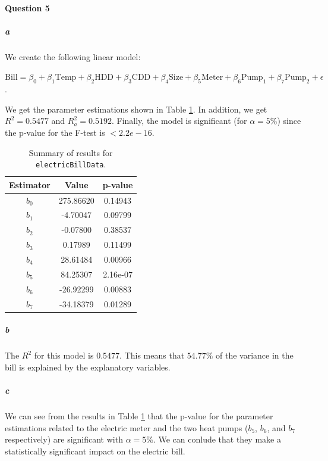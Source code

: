 \documentclass[]{article}
\let\oldparagraph\paragraph
\renewcommand{\paragraph}[1]{\oldparagraph{#1}\mbox{}}
\let\oldsubparagraph\subparagraph
\renewcommand{\subparagraph}[1]{\oldsubparagraph{#1}\mbox{}}
\begin{document}
\paragraph{\Large Question 5}\normalsize
\subparagraph{\Large a}\normalsize

We create the following linear model:

$\text{Bill} = \beta_0 + \beta_1 \text{Temp} + \beta_2 \text{HDD}+ \beta_3 \text{CDD}+ \beta_4 \text{Size} + \beta_5 \text{Meter} + \beta_6 \text{Pump}_1 + \beta_7 \text{Pump}_2 + \epsilon$.

We get the parameter estimations shown in Table \ref{q5a}. In addition, we get $R^2 = 0.5477$ and $R^2_a = 0.5192$. Finally, the model is significant (for $\alpha = 5\%$) since the p-value for the F-test is $< 2.2e-16$.

\begin{table}[!ht]
\caption{Summary of results for \texttt{electricBillData}.}
\begin{center}
\begin{tabular}{|c|c|c|}
\hline
Estimator & Value & p-value \\
\hline
$b_0$ & 275.86620 & 0.14943 \\
$b_1$ & -4.70047 & 0.09799 \\
$b_2$ & -0.07800 & 0.38537 \\
$b_3$ & 0.17989 & 0.11499 \\
$b_4$ & 28.61484 & 0.00966 \\
$b_5$ & 84.25307 & 2.16e-07 \\
$b_6$ & -26.92299 & 0.00883 \\
$b_7$ & -34.18379 & 0.01289 \\
\hline
\end{tabular}
\end{center}
\label{q5a}
\end{table}

\subparagraph{\Large b}\normalsize

The $R^2$ for this model is $0.5477$. This means that $54.77\%$ of the variance in the bill is explained by the explanatory variables.

\subparagraph{\Large c}\normalsize

We can see from the results in Table \ref{q5a} that the p-value for the parameter estimations related to the electric meter and the two heat pumps ($b_5$, $b_6$, and $b_7$ respectively) are significant with $\alpha = 5\%$. We can conlude that they make a statistically significant impact on the electric bill.
\end{document}
